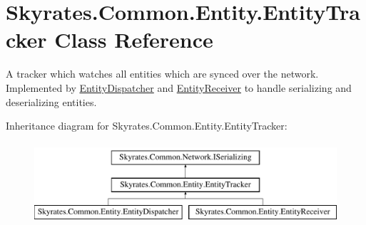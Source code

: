 \hypertarget{class_skyrates_1_1_common_1_1_entity_1_1_entity_tracker}{\section{Skyrates.\-Common.\-Entity.\-Entity\-Tracker Class Reference}
\label{class_skyrates_1_1_common_1_1_entity_1_1_entity_tracker}
}


A tracker which watches all entities which are synced over the network. Implemented by \hyperlink{class_skyrates_1_1_common_1_1_entity_1_1_entity_dispatcher}{Entity\-Dispatcher} and \hyperlink{class_skyrates_1_1_common_1_1_entity_1_1_entity_receiver}{Entity\-Receiver} to handle serializing and deserializing entities.  


Inheritance diagram for Skyrates.\-Common.\-Entity.\-Entity\-Tracker\-:\begin{figure}[H]
\begin{center}
\leavevmode
\includegraphics[height=3.000000cm]{class_skyrates_1_1_common_1_1_entity_1_1_entity_tracker}
\end{center}
\end{figure}
